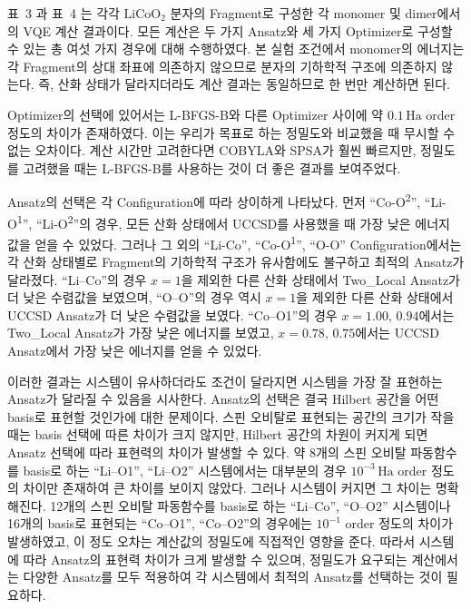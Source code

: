 \documentclass[pdflatex,sn-mathphys-num]{sn-jnl}%
\theoremstyle{thmstyleone}%
\theoremstyle{thmstyletwo}%
\theoremstyle{thmstylethree}%
\begin{document}
표~3 과 표~4 는 각각 \(\mathrm{LiCoO_2}\) 분자의 Fragment로 구성한 각 monomer 및 dimer에서의 VQE 계산 결과이다. 모든 계산은 두 가지 Ansatz와 세 가지 Optimizer로 구성할 수 있는 총 여섯 가지 경우에 대해 수행하였다. 본 실험 조건에서 monomer의 에너지는 각 Fragment의 상대 좌표에 의존하지 않으므로 분자의 기하학적 구조에 의존하지 않는다. 즉, 산화 상태가 달라지더라도 계산 결과는 동일하므로 한 번만 계산하면 된다.

Optimizer의 선택에 있어서는 L-BFGS-B와 다른 Optimizer 사이에 약 \(0.1\,\mathrm{Ha}\) order 정도의 차이가 존재하였다. 이는 우리가 목표로 하는 정밀도와 비교했을 때 무시할 수 없는 오차이다. 계산 시간만 고려한다면 COBYLA와 SPSA가 훨씬 빠르지만, 정밀도를 고려했을 때는 L-BFGS-B를 사용하는 것이 더 좋은 결과를 보여주었다.

Ansatz의 선택은 각 Configuration에 따라 상이하게 나타났다. 먼저 “Co-O\textsuperscript{2}”, “Li-O\textsuperscript{1}”, “Li-O\textsuperscript{2}”의 경우, 모든 산화 상태에서 UCCSD를 사용했을 때 가장 낮은 에너지 값을 얻을 수 있었다. 그러나 그 외의 “Li-Co”, “Co-O\textsuperscript{1}”, “O-O” Configuration에서는 각 산화 상태별로 Fragment의 기하학적 구조가 유사함에도 불구하고 최적의 Ansatz가 달라졌다. “Li--Co”의 경우 \(x=1\)을 제외한 다른 산화 상태에서 Two\_Local Ansatz가 더 낮은 수렴값을 보였으며, “O--O”의 경우 역시 \(x=1\)을 제외한 다른 산화 상태에서 UCCSD Ansatz가 더 낮은 수렴값을 보였다. “Co--O1”의 경우 \(x=1.00,\,0.94\)에서는 Two\_Local Ansatz가 가장 낮은 에너지를 보였고, \(x=0.78,\,0.75\)에서는 UCCSD Ansatz에서 가장 낮은 에너지를 얻을 수 있었다.

이러한 결과는 시스템이 유사하더라도 조건이 달라지면 시스템을 가장 잘 표현하는 Ansatz가 달라질 수 있음을 시사한다. Ansatz의 선택은 결국 Hilbert 공간을 어떤 basis로 표현할 것인가에 대한 문제이다. 스핀 오비탈로 표현되는 공간의 크기가 작을 때는 basis 선택에 따른 차이가 크지 않지만, Hilbert 공간의 차원이 커지게 되면 Ansatz 선택에 따라 표현력의 차이가 발생할 수 있다. 약 8개의 스핀 오비탈 파동함수를 basis로 하는 “Li--O1”, “Li--O2” 시스템에서는 대부분의 경우 \(10^{-3}\,\mathrm{Ha}\) order 정도의 차이만 존재하여 큰 차이를 보이지 않았다. 그러나 시스템이 커지면 그 차이는 명확해진다. 12개의 스핀 오비탈 파동함수를 basis로 하는 “Li--Co”, “O--O2” 시스템이나 16개의 basis로 표현되는 “Co--O1”, “Co--O2”의 경우에는 \(10^{-1}\) order 정도의 차이가 발생하였고, 이 정도 오차는 계산값의 정밀도에 직접적인 영향을 준다. 따라서 시스템에 따라 Ansatz의 표현력 차이가 크게 발생할 수 있으며, 정밀도가 요구되는 계산에서는 다양한 Ansatz를 모두 적용하여 각 시스템에서 최적의 Ansatz를 선택하는 것이 필요하다.
\newpage
\end{document}
